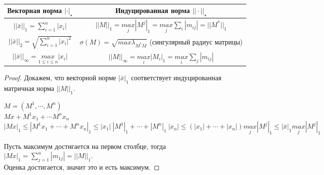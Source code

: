 \begin{theorem}
    \ 
\begin{center}
    \begin{tabular}{ | c || c |}
        \hline
        Векторная норма $|\cdot|_{\star}$ & Индуцированная норма $||\cdot||_{\star}$\\ \hline \hline
        $||\bar x||_1 = \sum\limits_{i=1}^n |x_i|$ & $||M||_1 = \underset{j}{max}|M^j|_1=\underset{j}{max}\sum\limits_i|m_{ij}|=||M^*||_1$  \\ \hline \hline
        $||\bar x||_2  = \sqrt{\sum\limits_{i=1}^n |x_i|^2}$ & $\sigma(M)=\sqrt{max \lambda_{M^*M}}$ (сингулярный радиус матрицы) \\
        \hline \hline
        $||\bar x||_\infty = \underset{1\leq i \leq n}{max} |x_i|$ & $||M||_{\infty} = \underset{i}{max}|M_i|_1=\underset{i}{max}\sum\limits_j|m_{ij}|$ \\ \hline
    \end{tabular}
\end{center}
\end{theorem}
\begin{proof}
Докажем, что векторной норме $|\bar x|_1$ соответствует индуцированная матричная норма $||M||_1$.\\
\begin{center} $M=(M^1,\cdots, M^n)$\\
    $Mx+M^1x_1+\cdots M^nx_n$\\
    $|Mx|_1\leqslant |M^1x_1+\cdots+M^nx_n|_1\leqslant|x_1|~|M^1|_1+\cdots+|M^n|_1~|x_n|\leqslant(|x_1|+\cdots+|x_n|)\underset{j}{max}|M^j|_1\leqslant|\bar x|_1\underset{j}{max}|M^j|_1$\end{center}
Пусть максимум достигается на первом столбце, тогда $|Mx|_1=\sum\limits_{j=1}^n|m_{1j}|=||M||_1$.\\
Оценка достигается, значит это и есть максимум.
\end{proof}
